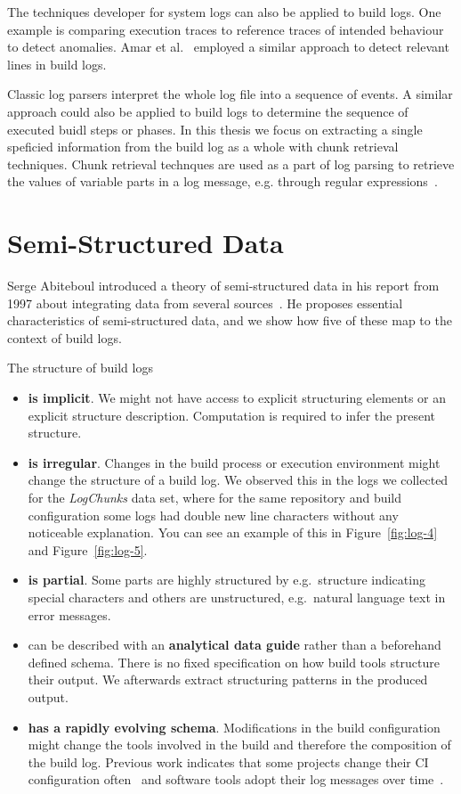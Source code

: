\documentclass[\myrootdir/main.tex]{subfiles}
\begin{document}
The techniques developer for system logs can also be applied to build logs.
One example is comparing execution traces to reference traces of intended behaviour to detect anomalies.
Amar et al.~\cite{amar2019mining} employed a similar approach to detect relevant lines in build logs.

Classic log parsers interpret the whole log file into a sequence of events.
A similar approach could also be applied to build logs to determine the sequence of executed buidl steps or phases.
In this thesis we focus on extracting a single speficied information from the build log as a whole with chunk retrieval techniques.
Chunk retrieval technques are used as a part of log parsing to retrieve the values of variable parts in a log message, e.g. through regular expressions~\cite{nagappan2010abstracting,xu2009detecting}.


\section{Semi-Structured Data}
\label{sec:rw-semi-structured-data}
Serge Abiteboul introduced a theory of semi-structured data in his report from 1997 about integrating data from several sources~\cite{abiteboul1997querying}.
He proposes essential characteristics of semi-structured data, and we show how five of these map to the context of build logs.

The structure of build logs
\begin{itemize}
  \item \textbf{is implicit}.
  We might not have access to explicit structuring elements or an explicit structure description.
  Computation is required to infer the present structure.
  \item \textbf{is irregular}.
  Changes in the build process or execution environment might change the structure of a build log.
  We observed this in the logs we collected for the \emph{LogChunks} data set, where for the same repository and build configuration some logs had double new line characters without any noticeable explanation.
  You can see an example of this in Figure~\ref{fig:log-4} and Figure~\ref{fig:log-5}.
  \item \textbf{is partial}. Some parts are highly structured by e.g.\ structure indicating special characters and others are unstructured, e.g.\ natural language text in error messages.
  \item can be described with an \textbf{analytical data guide} rather than a beforehand defined schema.
  There is no fixed specification on how build tools structure their output.
  We afterwards extract structuring patterns in the produced output.
  \item \textbf{has a rapidly evolving schema}.
  Modifications in the build configuration might change the tools involved in the build and therefore the composition of the build log.
  Previous work indicates that some projects change their CI configuration often~\cite{hilton2016usage} and software tools adopt their log messages over time~\cite{yuan2012characterizing}.
\end{itemize}
\end{document}
